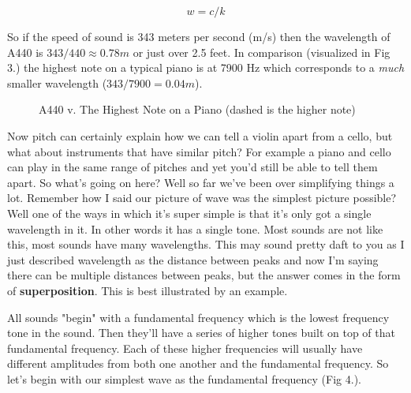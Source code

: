 \documentclass[10pt,a4paper]{article}
\begin{document}
\begin{equation}
w = c/k
\end{equation}

So if the speed of sound is 343 meters per second (m/s) then the wavelength of A440 is $343/440\approx0.78m$ or just over 2.5 feet. In comparison (visualized in Fig 3.) the highest note on a typical piano is at 7900 Hz \cite{wikipiano} which corresponds to a \textit{much} smaller wavelength ($343/7900=0.04m$).

\begin{figure}[!htb]
\caption{\label{fig:my-label} A440 v. The Highest Note on a Piano (dashed is the higher note)}
\end{figure}

Now pitch can certainly explain how we can tell a violin apart from a cello, but what about instruments that have similar pitch? For example a piano and cello can play in the same range of pitches and yet you'd still be able to tell them apart. So what's going on here? Well so far we've been over simplifying things a lot. Remember how I said our picture of wave was the simplest picture possible? Well one of the ways in which it's super simple is that it's only got a single wavelength in it. In other words it has a single tone. Most sounds are not like this, most sounds have many wavelengths. This may sound pretty daft to you as I just described wavelength as the distance between peaks and now I'm saying there can be multiple distances between peaks, but the answer comes in the form of \textbf{superposition}. This is best illustrated by an example. 

All sounds "begin" with a fundamental frequency which is the lowest frequency tone in the sound. Then they'll have a series of higher tones built on top of that fundamental frequency. Each of these higher frequencies will usually have different amplitudes from both one another and the fundamental frequency. So let's begin with our simplest wave as the fundamental frequency (Fig 4.).
\end{document}

